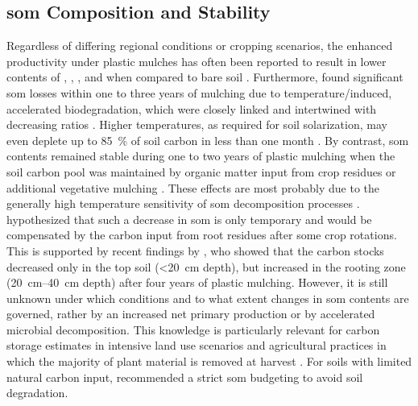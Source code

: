 \subsection{\Acs{som} Composition and Stability}

Regardless of differing regional conditions or cropping scenarios, the enhanced productivity under plastic mulches has often been reported to result in lower contents of , , , and  when compared to bare soil \citep{Domagala-SwiatkiewiczEffect2013,LiInfluence2007,SchonbeckEffects1998a}. Furthermore, \citet{MorenoEffect2008,LiDynamics2004,LiInfluence2007,ZhangEffects2015} found significant \ac{som} losses within one to three years of mulching due to temperature\-/induced, accelerated biodegradation, which were closely linked and intertwined with decreasing  ratios \citep{JiaDynamics2006,ZhouRidgefurrow2012}. Higher temperatures, as required for soil solarization, may even deplete up to \SI{85}{\percent} of soil carbon in less than one month \citep{SimmonsManaging2013}. By contrast, \ac{som} contents remained stable during one to two years of plastic mulching when the soil carbon pool was maintained by organic matter input from crop residues or additional vegetative mulching \citep{SchonbeckEffects1998a,TindallMulch1991}. These effects are most probably due to the generally high temperature sensitivity of \ac{som} decomposition processes \citep{LarionovaEffect2014, vonLutzowTemperature2009}.  hypothesized that such a decrease in \ac{som} is only temporary and would be compensated by the carbon input from root residues after some crop rotations. This is supported by recent findings by \citet{LuoSensitivity2015}, who showed that the carbon stocks decreased only in the top soil (\SI{<20}{\centi\meter} depth), but increased in the rooting zone (\SIrange{20}{40}{\centi\meter} depth) after four years of plastic mulching. However, it is still unknown under which conditions and to what extent changes in \ac{som} contents are governed, rather by an increased net primary production or by accelerated microbial decomposition. This knowledge is particularly relevant for carbon storage estimates in intensive land use scenarios and agricultural practices in which the majority of plant material is removed at harvest \citep{ChapmanSoil2012,PardoCultivationInduced2012,TianEffects2012}. For soils with limited natural carbon input, \citet{ZhangEffects2015} recommended a strict \ac{som} budgeting to avoid soil degradation.

